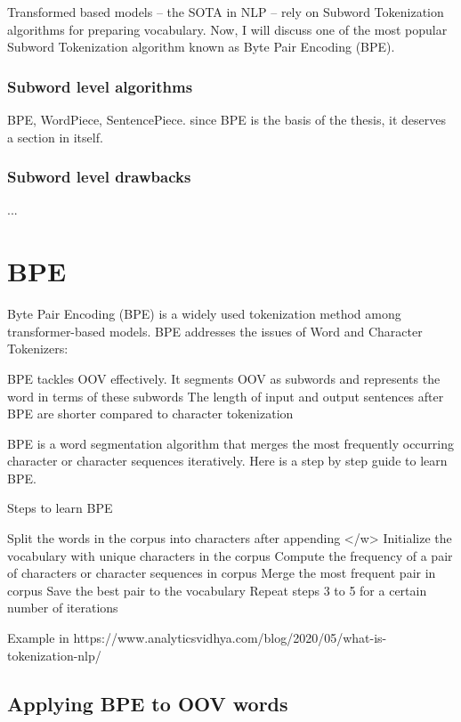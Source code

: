 Transformed based models – the SOTA in NLP – rely on Subword Tokenization algorithms for preparing vocabulary. Now, I will discuss one of the most popular Subword Tokenization algorithm known as Byte Pair Encoding (BPE).

\subsubsection{Subword level algorithms}

BPE, WordPiece, SentencePiece. since BPE is the basis of the thesis, it deserves a section in itself.

\subsubsection{Subword level drawbacks}

...

\section{BPE}

Byte Pair Encoding (BPE) is a widely used tokenization method among transformer-based models. BPE addresses the issues of Word and Character Tokenizers:

    BPE tackles OOV effectively. It segments OOV as subwords and represents the word in terms of these subwords
    The length of input and output sentences after BPE are shorter compared to character tokenization

BPE is a word segmentation algorithm that merges the most frequently occurring character or character sequences iteratively. Here is a step by step guide to learn BPE.

Steps to learn BPE

    Split the words in the corpus into characters after appending </w>
    Initialize the vocabulary with unique characters in the corpus
    Compute the frequency of a pair of characters or character sequences in corpus
    Merge the most frequent pair in corpus
    Save the best pair to the vocabulary
    Repeat steps 3 to 5 for a certain number of iterations

Example in https://www.analyticsvidhya.com/blog/2020/05/what-is-tokenization-nlp/

\subsection{Applying BPE to OOV words}

